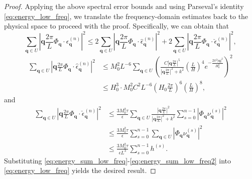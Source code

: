 \documentclass[review,onefignum,onetabnum]{siamart250211}
\begin{document}
\begin{proof}
Applying the above spectral error bounds and using Parseval's identity \eqref{eq:energy_low_freq}, we translate the frequency-domain estimates back to the physical space to proceed with the proof. Specifically, we can obtain that 
\begin{equation}
\sum_{\mathbf{q} \in U} \left| \mathbf{q} \frac{2\pi}{L} \Phi_{\mathbf q}\cdot \epsilon_{\mathbf{q}}^{(n)} \right|^2 \leq 2\sum_{\mathbf{q} \in U} \left| \mathbf{q} \frac{2\pi}{L}\Phi_{\mathbf q} \cdot \hat{\epsilon}_{\mathbf{q}}^{(n)} \right|^2 + 2\sum_{\mathbf{q} \in U} \left| \mathbf{q} \frac{2\pi}{L} \Phi_{\mathbf q}\cdot \check{\epsilon}_{\mathbf{q}}^{(n)} \right|^2,
\label{eq:energy_sum_low_freq}
\end{equation}
\begin{equation}
  \begin{aligned}
    \sum_{\mathbf{q} \in U} \left| \mathbf{q} \frac{2\pi}{L} \Phi_{\mathbf q}\cdot \hat{\epsilon}_{\mathbf{q}}^{(n)} \right|^2 
    &\leq M_0^2 L^{-6} \sum_{\mathbf{q} \in U} \left(\frac{C\left|\mathbf{q} \frac{2\pi}{L}\right|^5}{\left|\mathbf{q} \frac{2\pi}{L}\right|^2 + k^2} \left( \frac{L}{H} \right)^4 e^{-\frac{2\pi ^2|\mathbf q|^2}{H_0^2}}\right) ^2 \\
    &\leq H_0^3 \cdot M_0^2 C^2 L^{-6} \left( H_0 \frac{2\pi}{L} \right)^6 \left( \frac{L}{H} \right)^8,
  \end{aligned}
  \label{eq:energy_sum_low_freq1}
\end{equation}
and 
\begin{equation}
  \begin{aligned}
    \sum_{\mathbf{q} \in U} \left| \mathbf{q} \frac{2\pi}{L}\Phi_{\mathbf q} \cdot \check{\epsilon}_{\mathbf{q}}^{(n)} \right|^2 
    &\leq \frac{3M_0^2 \tau}{\epsilon} \sum_{\mathbf{q} \in U} \frac{|\mathbf{q}\frac{2\pi}{L}|^2}{|\mathbf{q}\frac{2\pi}{L}|^2 + k^2} \sum_{s=0}^{n-1} \left|\Phi_{\mathbf q}\nu_{\mathbf{q}}^{(s)}\right|^2 \\
    &\leq \frac{3M_0^2 \tau}{\epsilon} \sum_{s=0}^{n-1} \sum_{\mathbf{q} \in U}  \left|\Phi_{\mathbf q}\nu_{\mathbf{q}}^{(s)}\right|^2\\
    &\leq \frac{3M_0^2 \tau}{\epsilon L^3} \sum_{s=0}^{n-1} h^{(s)}.
  \end{aligned}
  \label{eq:energy_sum_low_freq2}
\end{equation}
Substituting \eqref{eq:energy_sum_low_freq}-\eqref{eq:energy_sum_low_freq2} into \eqref{eq:energy_low_freq} yields the desired result.
\end{proof}
\end{document}

